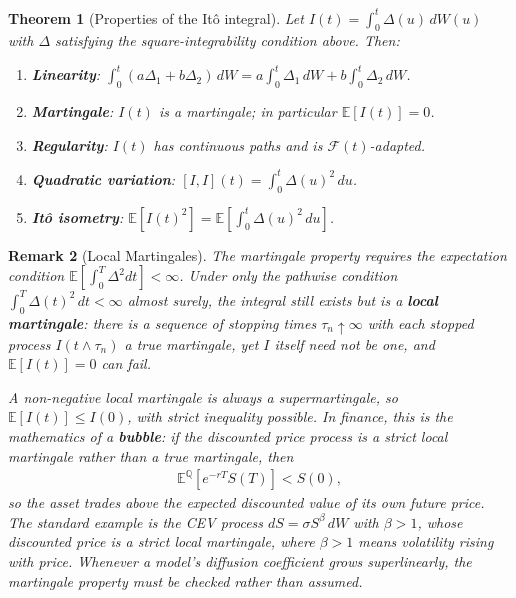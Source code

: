 \documentclass{report}
\theoremstyle{spacedplain}
\newtheorem{theorem}{Theorem}[section]
\theoremstyle{spaceddefinition}
\theoremstyle{spacedremark}
\newtheorem{remark}[theorem]{Remark}
\begin{document}
\begin{theorem}[Properties of the It\^o integral]
Let $I(t) = \int_0^t \Delta(u)\, dW(u)$ with $\Delta$ satisfying the square-integrability condition above. Then:
\begin{enumerate}[noitemsep]
    \item \textbf{Linearity}: $\int_0^t (a\Delta_1 + b\Delta_2)\,dW = a\int_0^t \Delta_1\,dW + b\int_0^t\Delta_2\,dW$.
    \item \textbf{Martingale}: $I(t)$ is a martingale; in particular $\mathbb{E}[I(t)] = 0$.
    \item \textbf{Regularity}: $I(t)$ has continuous paths and is $\mathcal{F}(t)$-adapted.
    \item \textbf{Quadratic variation}: $[I,I](t) = \int_0^t \Delta(u)^2\, du$.
    \item \textbf{It\^o isometry}: $\mathbb{E}\!\left[I(t)^2\right] = \mathbb{E}\!\left[\int_0^t \Delta(u)^2\, du\right]$.
\end{enumerate}
\end{theorem}

\begin{remark}[Local Martingales]\label{rmk:local-mart}
The martingale property requires the \emph{expectation} condition $\mathbb{E}\!\left[\int_0^T\Delta^2 dt\right]<\infty$. Under only the pathwise condition $\int_0^T \Delta(t)^2\,dt < \infty$ almost surely, the integral still exists but is a \textbf{local martingale}: there is a sequence of stopping times $\tau_n\uparrow\infty$ with each stopped process $I(t\wedge\tau_n)$ a true martingale, yet $I$ itself need not be one, and $\mathbb{E}[I(t)]=0$ can fail.

A non-negative local martingale is always a \emph{supermartingale}, so $\mathbb{E}[I(t)] \leq I(0)$, with strict inequality possible. In finance, this is the mathematics of a \textbf{bubble}: if the discounted price process is a strict local martingale rather than a true martingale, then
\begin{align}
    \mathbb{E}^{\mathbb{Q}}\!\left[e^{-rT}S(T)\right] < S(0),
\end{align}
so the asset trades \emph{above} the expected discounted value of its own future price. The standard example is the CEV process $dS = \sigma S^{\beta}\,dW$ with $\beta > 1$, whose discounted price is a strict local martingale, where $\beta>1$ means volatility rising with price. Whenever a model's diffusion coefficient grows superlinearly, the martingale property must be checked rather than assumed.
\end{remark}
\end{document}

